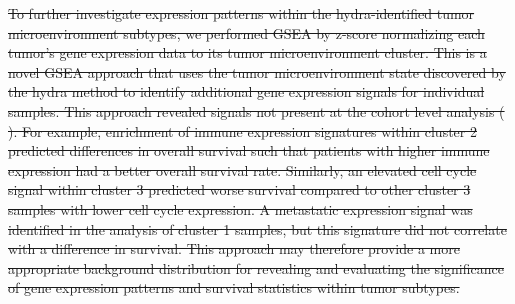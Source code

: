 \documentclass[10pt,letterpaper]{article}
\providecommand{\DIFdeltex}[1]{{\protect\color{red}\sout{#1}}}                      %
\providecommand{\DIFdel}[1]{\texorpdfstring{\DIFdeltex{#1}}{}} %
\begin{document}
\DIFdel{To further investigate expression patterns within the hydra-identified tumor microenvironment subtypes, we performed GSEA by z-score normalizing each tumor’s gene expression data to its tumor microenvironment cluster. This is a novel GSEA approach that uses the tumor microenvironment state discovered by the hydra method to identify additional gene expression signals for individual samples. This approach revealed signals not present at the cohort level analysis (}%
\DIFdel{). For example, enrichment of immune expression signatures within cluster 2 predicted differences in overall survival such that patients with higher immune expression had a better overall survival rate. Similarly, an elevated cell cycle signal within cluster 3 predicted worse survival compared to other cluster 3 samples with lower cell cycle expression. A metastatic expression signal was identified in the analysis of cluster 1 samples, but this signature did not correlate with a difference in survival. This approach may therefore provide a more appropriate background distribution for revealing and evaluating the significance of gene expression patterns and survival statistics within tumor subtypes.
}%

\end{document}
